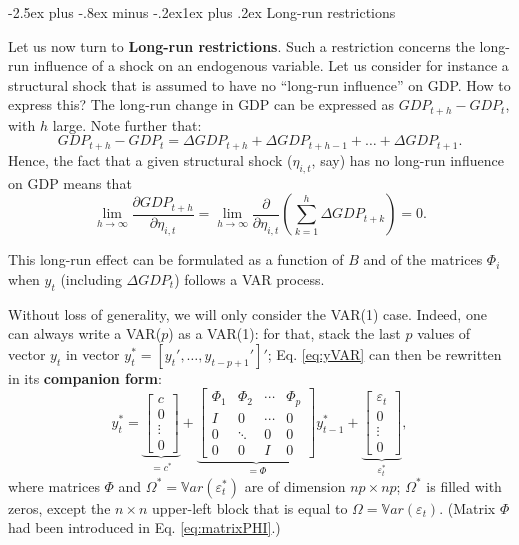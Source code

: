 \documentclass[
  11pt,
]{book}
\makeatletter
\renewcommand\subsection{\@startsection{subsection}{2}{\z@}
  {-2.5ex plus -.8ex minus -.2ex}{1ex plus .2ex}
  {\normalfont\large\bfseries\color{TextbookInk}}}
\theoremstyle{definition}
\theoremstyle{definition}
\theoremstyle{definition}
\theoremstyle{definition}
\theoremstyle{remark}
\makeatother
\begin{document}
\subsection{Long-run restrictions}\label{long-run-restrictions}

Let us now turn to \textbf{Long-run restrictions}. Such a restriction concerns the long-run influence of a shock on an endogenous variable. Let us consider for instance a structural shock that is assumed to have no ``long-run influence'' on GDP. How to express this? The long-run change in GDP can be expressed as \(GDP_{t+h} - GDP_t\), with \(h\) large. Note further that:
\[
GDP_{t+h} - GDP_t = \Delta GDP_{t+h} +\Delta GDP_{t+h-1} + \dots + \Delta GDP_{t+1}.
\]
Hence, the fact that a given structural shock (\(\eta_{i,t}\), say) has no long-run influence on GDP means that
\[
\lim_{h\rightarrow\infty}\frac{\partial GDP_{t+h}}{\partial \eta_{i,t}} = \lim_{h\rightarrow\infty} \frac{\partial}{\partial \eta_{i,t}}\left(\sum_{k=1}^h \Delta  GDP_{t+k}\right)= 0.
\]

This long-run effect can be formulated as a function of \(B\) and of the matrices \(\Phi_i\) when \(y_t\) (including \(\Delta GDP_t\)) follows a VAR process.

Without loss of generality, we will only consider the VAR(1) case. Indeed, one can always write a VAR(\(p\)) as a VAR(1): for that, stack the last \(p\) values of vector \(y_t\) in vector \(y_{t}^{*}=[y_t',\dots,y_{t-p+1}']'\); Eq. \eqref{eq:yVAR} can then be rewritten in its \textbf{companion form}:
\begin{equation}
y_{t}^{*} =
\underbrace{\left[\begin{array}{c}
c\\
0\\
\vdots\\
0\end{array}\right]}_{=c^*}+
\underbrace{\left[\begin{array}{cccc}
\Phi_{1} & \Phi_{2} & \cdots & \Phi_{p}\\
I & 0 & \cdots & 0\\
0 & \ddots & 0 & 0\\
0 & 0 & I & 0\end{array}\right]}_{=\Phi}
y_{t-1}^{*}+
\underbrace{\left[\begin{array}{c}
\varepsilon_{t}\\
0\\
\vdots\\
0\end{array}\right]}_{\varepsilon_t^*},\label{eq:ystarVAR}
\end{equation}
where matrices \(\Phi\) and \(\Omega^* = \mathbb{V}ar(\varepsilon_t^*)\) are of dimension \(np \times np\); \(\Omega^*\) is filled with zeros, except the \(n\times n\) upper-left block that is equal to \(\Omega = \mathbb{V}ar(\varepsilon_t)\). (Matrix \(\Phi\) had been introduced in Eq. \eqref{eq:matrixPHI}.)
\end{document}
